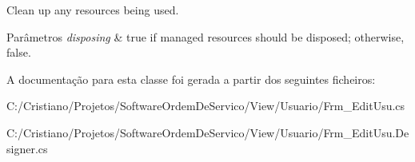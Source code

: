 Clean up any resources being used. 


\begin{DoxyParams}{Parâmetros}
{\em disposing} & true if managed resources should be disposed; otherwise, false.\\
\hline
\end{DoxyParams}


A documentação para esta classe foi gerada a partir dos seguintes ficheiros\+:\begin{DoxyCompactItemize}
\item 
C\+:/\+Cristiano/\+Projetos/\+Software\+Ordem\+De\+Servico/\+View/\+Usuario/Frm\+\_\+\+Edit\+Usu.\+cs\item 
C\+:/\+Cristiano/\+Projetos/\+Software\+Ordem\+De\+Servico/\+View/\+Usuario/Frm\+\_\+\+Edit\+Usu.\+Designer.\+cs\end{DoxyCompactItemize}
